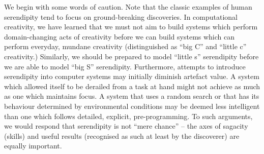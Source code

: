 We begin with some words of caution.
%
Note that the classic examples of human serendipity tend to focus on
ground-breaking discoveries.  In computational creativity, we have
learned that we must not aim to build systems which perform
domain-changing acts of creativity before we can build systems which
can perform everyday, mundane creativity (distinguished as ``big C''
and ``little c'' creativity.)  Similarly, we should be prepared to
model ``little s'' serendipity before we are able to model ``big S''
serendipity.  Furthermore, attempts to introduce serendipity into
computer systems may initially diminish artefact value.
%
A system which allowed itself to be derailed from a task at hand might
not achieve as much as one which maintains focus.  A system that uses
a random search or that has its behaviour determined by environmental
conditions may be deemed less intelligent than one which follows
detailed, explicit, pre-programming.
%
To such arguments, we would respond that serendipity is not ``mere
chance'' -- the axes of sagacity (skills) and useful results
(recognised as such at least by the discoverer) are equally important.
